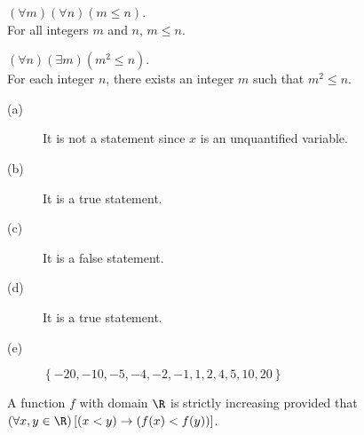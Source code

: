 \vskip9pt
\begin{list}{\bf{\ref{exer:sec24-4}.}} 
\item \begin{list}{\bf{(a)}} 
\item $\left( \forall m \right) \left( \forall n \right) \left( m \le n \right)$.  \\
For all integers $m$ and $n$, $m \le n$.
\end{list}
\end{list}
%
\begin{list}{}
\item \begin{list}{\bf{(e)}} 
\item $\left( \forall n \right) \left( \exists m \right) \left( m^2 \le n \right)$.  \\
For each integer $n$, there exists an integer $m$ such that  $m^2 \le n$.
\end{list}
\end{list}

\begin{list}{\bf{\ref{Exer:quantifier1}.}}
\item \begin{description}
\item[(a)] It is not a statement since $x$ is an unquantified variable.
\item[(b)] It is a true statement.
\item[(c)] It is a false statement.
\item[(d)] It is a true statement.
\item[(e)] $\left\{ -20, -10, -5, -4, -2, -1, 1, 2, 4, 5, 10, 20 \right\}$
\end{description}
\end{list}
  
\begin{list}{\bf{\ref{exer:24-increasing}.}}
\item \begin{list}{\bf{(a)}}
\item A function $f$ with domain $\R$ is strictly increasing provided that \\ 
$\left( \forall x, y \in \R \right) \left[ \left( x < y \right) \to \left( f(x) < f(y) \right) \right]$.
\end{list}
\end{list}
\hbreak
